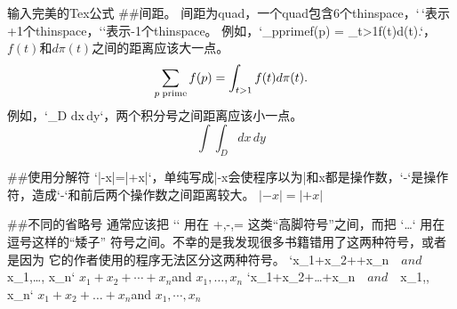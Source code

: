 \documentclass{article}
\begin{document}
输入完美的Tex公式
##间距。
间距为quad，一个quad包含6个thinspace，`\,`表示+1个thinspace，`\!`表示-1个thinspace。
例如，`\sum_{p\rm\;prime}f(p) = \int_{t>1}f(t)d\pi(t).`，$f(t)$和$d\pi(t)$之间的距离应该大一点。
$$\sum_{p\rm\;prime}f(p) = \int_{t>1}f(t)d\pi(t).$$
例如，`\int\!\!\!\int_D dx\,dy`，两个积分号之间距离应该小一点。
$$\int\!\!\!\int_D dx\,dy$$

##使用分解符
`\left|-x\right|=\left|+x\right|`，单纯写成|-x会使程序以为|和x都是操作数，`-`是操作符，造成`-`和前后两个操作数之间距离较大。
$\left|-x\right|=\left|+x\right|$

##不同的省略号
通常应该把 `\cdots` 用在 +,-,= 这类“高脚符号”之间，而把 `\ldots` 用在逗号这样的“矮子” 符号之间。不幸的是我发现很多书籍错用了这两种符号，或者是因为 它的作者使用的程序无法区分这两种符号。
`x_1+x_2+\cdots+x_n$\quad and \quad $x_1,\ldots, x_n`
$x_1+x_2+\cdots+x_n$\quad and \quad $x_1,\ldots, x_n$
`x_1+x_2+\ldots+x_n$\quad and \quad $x_1,\cdots, x_n`
$x_1+x_2+\ldots+x_n$\quad and \quad $x_1,\cdots, x_n$
\end{document}
